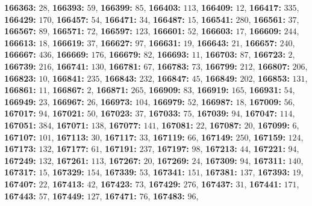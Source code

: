 \textsf{\bfseries 166363:} $28$, \textsf{\bfseries 166393:} $59$, \textsf{\bfseries 166399:} $85$, \textsf{\bfseries 166403:} $113$, \textsf{\bfseries 166409:} $12$, \textsf{\bfseries 166417:} $335$, \textsf{\bfseries 166429:} $170$, \textsf{\bfseries 166457:} $54$, \textsf{\bfseries 166471:} $34$, \textsf{\bfseries 166487:} $15$, \textsf{\bfseries 166541:} $280$, \textsf{\bfseries 166561:} $37$, \textsf{\bfseries 166567:} $89$, \textsf{\bfseries 166571:} $72$, \textsf{\bfseries 166597:} $123$, \textsf{\bfseries 166601:} $52$, \textsf{\bfseries 166603:} $17$, \textsf{\bfseries 166609:} $244$, \textsf{\bfseries 166613:} $18$, \textsf{\bfseries 166619:} $37$, \textsf{\bfseries 166627:} $97$, \textsf{\bfseries 166631:} $19$, \textsf{\bfseries 166643:} $21$, \textsf{\bfseries 166657:} $240$, \textsf{\bfseries 166667:} $436$, \textsf{\bfseries 166669:} $176$, \textsf{\bfseries 166679:} $82$, \textsf{\bfseries 166693:} $11$, \textsf{\bfseries 166703:} $87$, \textsf{\bfseries 166723:} $2$, \textsf{\bfseries 166739:} $216$, \textsf{\bfseries 166741:} $130$, \textsf{\bfseries 166781:} $67$, \textsf{\bfseries 166783:} $73$, \textsf{\bfseries 166799:} $212$, \textsf{\bfseries 166807:} $206$, \textsf{\bfseries 166823:} $10$, \textsf{\bfseries 166841:} $235$, \textsf{\bfseries 166843:} $232$, \textsf{\bfseries 166847:} $45$, \textsf{\bfseries 166849:} $202$, \textsf{\bfseries 166853:} $131$, \textsf{\bfseries 166861:} $11$, \textsf{\bfseries 166867:} $2$, \textsf{\bfseries 166871:} $265$, \textsf{\bfseries 166909:} $83$, \textsf{\bfseries 166919:} $165$, \textsf{\bfseries 166931:} $54$, \textsf{\bfseries 166949:} $23$, \textsf{\bfseries 166967:} $26$, \textsf{\bfseries 166973:} $104$, \textsf{\bfseries 166979:} $52$, \textsf{\bfseries 166987:} $18$, \textsf{\bfseries 167009:} $56$, \textsf{\bfseries 167017:} $94$, \textsf{\bfseries 167021:} $50$, \textsf{\bfseries 167023:} $37$, \textsf{\bfseries 167033:} $75$, \textsf{\bfseries 167039:} $94$, \textsf{\bfseries 167047:} $114$, \textsf{\bfseries 167051:} $384$, \textsf{\bfseries 167071:} $138$, \textsf{\bfseries 167077:} $141$, \textsf{\bfseries 167081:} $22$, \textsf{\bfseries 167087:} $20$, \textsf{\bfseries 167099:} $6$, \textsf{\bfseries 167107:} $101$, \textsf{\bfseries 167113:} $30$, \textsf{\bfseries 167117:} $33$, \textsf{\bfseries 167119:} $66$, \textsf{\bfseries 167149:} $250$, \textsf{\bfseries 167159:} $124$, \textsf{\bfseries 167173:} $132$, \textsf{\bfseries 167177:} $61$, \textsf{\bfseries 167191:} $237$, \textsf{\bfseries 167197:} $98$, \textsf{\bfseries 167213:} $44$, \textsf{\bfseries 167221:} $94$, \textsf{\bfseries 167249:} $132$, \textsf{\bfseries 167261:} $113$, \textsf{\bfseries 167267:} $20$, \textsf{\bfseries 167269:} $24$, \textsf{\bfseries 167309:} $94$, \textsf{\bfseries 167311:} $140$, \textsf{\bfseries 167317:} $15$, \textsf{\bfseries 167329:} $154$, \textsf{\bfseries 167339:} $53$, \textsf{\bfseries 167341:} $151$, \textsf{\bfseries 167381:} $137$, \textsf{\bfseries 167393:} $19$, \textsf{\bfseries 167407:} $22$, \textsf{\bfseries 167413:} $42$, \textsf{\bfseries 167423:} $73$, \textsf{\bfseries 167429:} $276$, \textsf{\bfseries 167437:} $31$, \textsf{\bfseries 167441:} $171$, \textsf{\bfseries 167443:} $57$, \textsf{\bfseries 167449:} $127$, \textsf{\bfseries 167471:} $76$, \textsf{\bfseries 167483:} $96$, 
